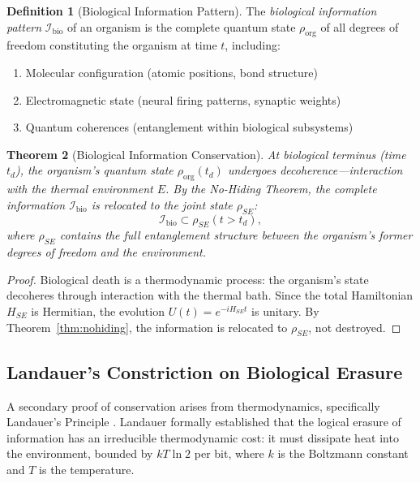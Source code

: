 \documentclass[12pt, a4paper]{article}
\theoremstyle{plain}
\newtheorem{theorem}{Theorem}[section]
\theoremstyle{definition}
\newtheorem{definition}[theorem]{Definition}
\begin{document}
\begin{definition}[Biological Information Pattern]\label{def:bio}
  The \emph{biological information pattern} $\mathcal{I}_{\text{bio}}$
  of an organism is the complete quantum state $\rho_{\text{org}}$
  of all degrees of freedom constituting the organism at time $t$,
  including:
  \begin{enumerate}[label=(\alph*)]
    \item Molecular configuration (atomic positions, bond structure)
    \item Electromagnetic state (neural firing patterns, synaptic weights)
    \item Quantum coherences (entanglement within biological subsystems)
  \end{enumerate}
\end{definition}

\begin{theorem}[Biological Information Conservation]\label{thm:biocons}
  At biological terminus (time $t_d$), the organism's quantum state
  $\rho_{\text{org}}(t_d)$ undergoes decoherence---interaction with the
  thermal environment $E$. By the No-Hiding Theorem, the complete
  information $\mathcal{I}_{\text{bio}}$ is relocated to the joint
  state $\rho_{SE}$:
  \begin{equation}
    \mathcal{I}_{\text{bio}} \subset \rho_{SE}(t > t_d),
  \end{equation}
  where $\rho_{SE}$ contains the full entanglement structure between
  the organism's former degrees of freedom and the environment.
\end{theorem}

\begin{proof}
  Biological death is a thermodynamic process: the organism's state
  decoheres through interaction with the thermal bath. Since the total
  Hamiltonian $H_{SE}$ is Hermitian, the evolution $U(t) = e^{-iH_{SE}t}$
  is unitary. By Theorem~\ref{thm:nohiding}, the information is relocated
  to $\rho_{SE}$, not destroyed. \qedhere
\end{proof}

\subsection{Landauer's Constriction on Biological Erasure}

A secondary proof of conservation arises from thermodynamics, specifically Landauer's Principle \citep{Landauer1961}. Landauer formally established that the logical erasure of information has an irreducible thermodynamic cost: it must dissipate heat into the environment, bounded by $kT \ln 2$ per bit, where $k$ is the Boltzmann constant and $T$ is the temperature.
\end{document}
